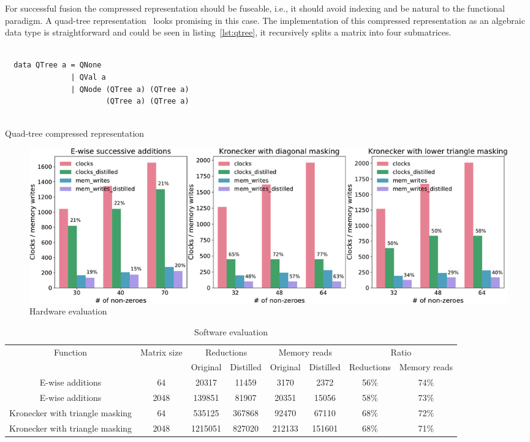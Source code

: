 \documentclass[10pt,conference]{IEEEtran}
\begin{document}
For successful fusion the compressed representation should be fuseable, i.e., it should avoid indexing and be natural to the functional paradigm.
A quad-tree representation~\cite{qtree} looks promising in this case. 
The implementation of this compressed representation as an algebraic data type is straightforward and could be seen in listing~\ref{lst:qtree}, it recursively splits a matrix into four submatrices.

\begin{listing}

  \begin{verbatim}

  data QTree a = QNone  
               | QVal a 
               | QNode (QTree a) (QTree a)
                       (QTree a) (QTree a) 
  
  \end{verbatim}
  \caption{Quad-tree compressed representation}
  \label{lst:qtree}
  
  \end{listing}


\begin{figure}[t]
  \includegraphics[width=\textwidth]{figs/HardwareBenchs_3.pdf}
  \caption{Hardware evaluation}
  \label{fig:evaluation}
\end{figure}



\begin{table}[t!]
  \centering
  \begin{tabular}{ |c|c|c|c|c|c|c|c|} 
\hline
\multirow{2}{5em}{Function} & \multirow{2}{5em}{Matrix size} & \multicolumn{2}{c}{Reductions} \vline & \multicolumn{2}{c}{Memory reads} \vline& \multicolumn{2}{c}{Ratio}\vline\\
\cline{3-8}
{}&{}&Original&Distilled&Original&Distilled&Reductions&Memory reads\\
\hline
E-wise additions & 64 & 20317 & 11459 & 3170 & 2372 &56\% &74\%\\
E-wise additions & 2048 & 139851 & 81907 & 20351 & 15056 & 58\% & 73\%\\
Kronecker with triangle masking & 64 & 535125 & 367868 & 92470 & 67110 & 68\% & 72\%\\
Kronecker with triangle masking & 2048 & 1215051 & 827020 & 212133 & 151601 & 68\% & 71\%\\
\hline

\end{tabular}
  \caption{Software evaluation}
  \label{tab:table_distill}
\end{table}
\end{document}
